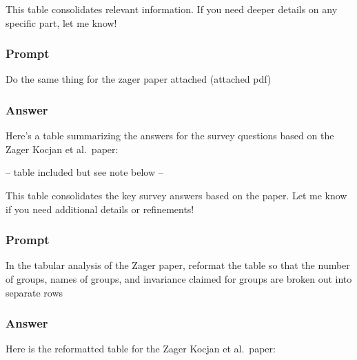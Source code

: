 \documentclass[
  man]{apa7}
\begin{document}
This table consolidates relevant information. If you need deeper details on any specific part, let me know!

\subsubsection{Prompt}\label{prompt-1}

Do the same thing for the zager paper attached (attached pdf)

\subsubsection{Answer}\label{answer-1}

Here's a table summarizing the answers for the survey questions based on the Zager Kocjan et al.~paper:

-- table included but see note below --

This table consolidates the key survey answers based on the paper. Let me know if you need additional details or refinements!

\subsubsection{Prompt}\label{prompt-2}

In the tabular analysis of the Zager paper, reformat the table so that the number of groups, names of groups, and invariance claimed for groups are broken out into separate rows

\subsubsection{Answer}\label{answer-2}

Here is the reformatted table for the Zager Kocjan et al.~paper:
\end{document}
